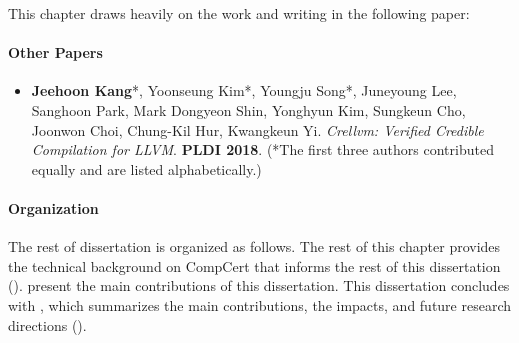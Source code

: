 This chapter draws heavily on the work and writing in the following paper:


\paragraph{Other Papers}


\begin{itemize}
\item[\cite{crellvm}] \textbf{Jeehoon Kang}*, Yoonseung Kim*, Youngju Song*, Juneyoung Lee, Sanghoon
  Park, Mark Dongyeon Shin, Yonghyun Kim, Sungkeun Cho, Joonwon Choi, Chung-Kil Hur, Kwangkeun Yi.
  \emph{Crellvm: Verified Credible Compilation for LLVM}.  \textbf{PLDI 2018}.  (*The first three
  authors contributed equally and are listed alphabetically.)
\end{itemize}


\paragraph{Organization}

The rest of dissertation is organized as follows.  The rest of this chapter provides the technical
background on CompCert that informs the rest of this dissertation ().
 present the main contributions of this
dissertation.  This dissertation concludes with , which summarizes the main
contributions, the impacts, and future research directions ().









